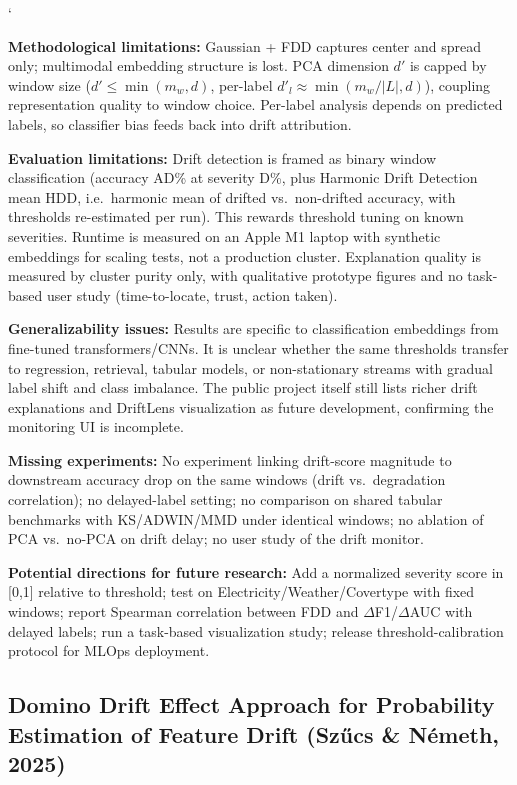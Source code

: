 `\documentclass[10pt]{article}
\newcommand{\sumitem}[2]{\noindent\textbf{#1:} #2\par}
\begin{document}
\sumitem{Methodological limitations}{Gaussian + FDD captures center and spread only; multimodal embedding structure is lost. PCA dimension $d'$ is capped by window size ($d' \leq \min(m_w, d)$, per-label $d'_l \approx \min(m_w/|L|, d)$), coupling representation quality to window choice. Per-label analysis depends on predicted labels, so classifier bias feeds back into drift attribution.}

\sumitem{Evaluation limitations}{Drift detection is framed as binary window classification (accuracy AD\% at severity D\%, plus Harmonic Drift Detection mean HDD, i.e.\ harmonic mean of drifted vs.\ non-drifted accuracy, with thresholds re-estimated per run). This rewards threshold tuning on known severities. Runtime is measured on an Apple M1 laptop with synthetic embeddings for scaling tests, not a production cluster. Explanation quality is measured by cluster purity only, with qualitative prototype figures and no task-based user study (time-to-locate, trust, action taken).}

\sumitem{Generalizability issues}{Results are specific to classification embeddings from fine-tuned transformers/CNNs. It is unclear whether the same thresholds transfer to regression, retrieval, tabular models, or non-stationary streams with gradual label shift and class imbalance. The public project itself still lists richer drift explanations and DriftLens visualization as future development, confirming the monitoring UI is incomplete.}

\sumitem{Missing experiments}{No experiment linking drift-score magnitude to downstream accuracy drop on the same windows (drift vs.\ degradation correlation); no delayed-label setting; no comparison on shared tabular benchmarks with KS/ADWIN/MMD under identical windows; no ablation of PCA vs.\ no-PCA on drift delay; no user study of the drift monitor.}

\sumitem{Potential directions for future research}{Add a normalized severity score in [0,1] relative to threshold; test on Electricity/Weather/Covertype with fixed windows; report Spearman correlation between FDD and $\Delta$F1/$\Delta$AUC with delayed labels; run a task-based visualization study; release threshold-calibration protocol for MLOps deployment.}

\clearpage
\subsection{Domino Drift Effect Approach for Probability Estimation of Feature Drift (Sz\H{u}cs \& N\'emeth, 2025)}
\end{document}
